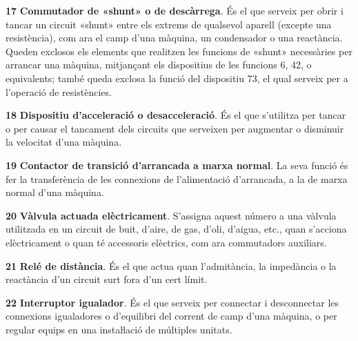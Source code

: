 \begin{multicols}{2}
\begin{list}{}
\item[\textbf{17}]   
  
\textbf{Commutador de  «shunt» o de descàrrega}. És el que serveix per obrir i tancar
un circuit «shunt» entre els extrems de qualsevol aparell (excepte
una resistència), com ara el camp d'una màquina, un condensador o
una reactància. Queden exclosos els elements que realitzen les
funcions de «shunt» necessàries per arrancar una màquina, mitjançant
els dispositius de les funcions 6, 42, o equivalents; també queda exclosa la funció
del dispositiu 73, el qual serveix per a l'operació de resistències.

\item[\textbf{18}]  
 \textbf{Dispositiu d'acceleració o desacceleració}. És
el que s'utilitza per tancar o per causar el tancament dels circuits
que serveixen per augmentar o disminuir la velocitat d'una màquina.

\item[\textbf{19}]  
\textbf{Contactor de transició d'arrancada a marxa normal}. La seva
funció és fer la transferència de les connexions de l'alimentació
d'arrancada, a la de marxa normal d'una màquina.

\item[\textbf{20}]  
 \textbf{Vàlvula actuada elèctricament}. S'assigna aquest número a una vàlvula
utilitzada en un circuit de buit, d'aire, de gas, d'oli, d'aigua,
etc., quan s'acciona elèctricament o quan té accessoris elèctrics,
com ara commutadors auxiliars.

\item[\textbf{21}]   
\textbf{Relé de distància}. És el que actua
quan l'admitància, la impedància o la reactància d'un circuit surt fora d'un cert límit.

\item[\textbf{22}]   
\textbf{Interruptor igualador}.  És el
que serveix per connectar i desconnectar les connexions igualadores
o d'equilibri del corrent de camp d'una màquina, o per regular
equips en una  instaŀlació de  múltiples unitats.


\end{list}
\end{multicols}
